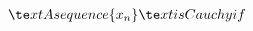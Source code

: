 \documentclass[preview]{standalone}
\begin{document}
\begin{align*}
\te x t{A seque n ce }\{ x _ n \}\te x t{ is Cauchy if }
\end{align*}
\end{document}

